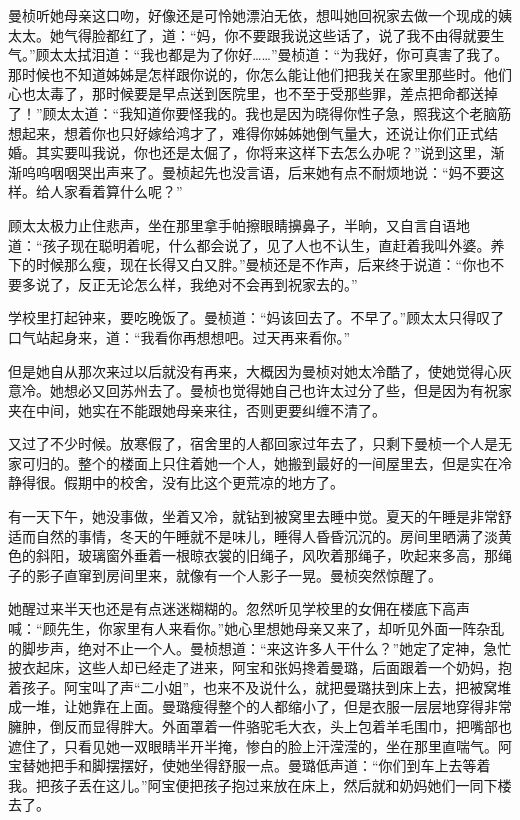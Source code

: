 \par 曼桢听她母亲这口吻，好像还是可怜她漂泊无依，想叫她回祝家去做一个现成的姨太太。她气得脸都红了，道：“妈，你不要跟我说这些话了，说了我不由得就要生气。”顾太太拭泪道：“我也都是为了你好……”曼桢道：“为我好，你可真害了我了。那时候也不知道姊姊是怎样跟你说的，你怎么能让他们把我关在家里那些时。他们心也太毒了，那时候要是早点送到医院里，也不至于受那些罪，差点把命都送掉了！”顾太太道：“我知道你要怪我的。我也是因为晓得你性子急，照我这个老脑筋想起来，想着你也只好嫁给鸿才了，难得你姊姊她倒气量大，还说让你们正式结婚。其实要叫我说，你也还是太倔了，你将来这样下去怎么办呢？”说到这里，渐渐呜呜咽咽哭出声来了。曼桢起先也没言语，后来她有点不耐烦地说：“妈不要这样。给人家看着算什么呢？”
\par 顾太太极力止住悲声，坐在那里拿手帕擦眼睛擤鼻子，半晌，又自言自语地道：“孩子现在聪明着呢，什么都会说了，见了人也不认生，直赶着我叫外婆。养下的时候那么瘦，现在长得又白又胖。”曼桢还是不作声，后来终于说道：“你也不要多说了，反正无论怎么样，我绝对不会再到祝家去的。”
\par 学校里打起钟来，要吃晚饭了。曼桢道：“妈该回去了。不早了。”顾太太只得叹了口气站起身来，道：“我看你再想想吧。过天再来看你。”
\par 但是她自从那次来过以后就没有再来，大概因为曼桢对她太冷酷了，使她觉得心灰意冷。她想必又回苏州去了。曼桢也觉得她自己也许太过分了些，但是因为有祝家夹在中间，她实在不能跟她母亲来往，否则更要纠缠不清了。
\par 又过了不少时候。放寒假了，宿舍里的人都回家过年去了，只剩下曼桢一个人是无家可归的。整个的楼面上只住着她一个人，她搬到最好的一间屋里去，但是实在冷静得很。假期中的校舍，没有比这个更荒凉的地方了。
\par 有一天下午，她没事做，坐着又冷，就钻到被窝里去睡中觉。夏天的午睡是非常舒适而自然的事情，冬天的午睡就不是味儿，睡得人昏昏沉沉的。房间里晒满了淡黄色的斜阳，玻璃窗外垂着一根晾衣裳的旧绳子，风吹着那绳子，吹起来多高，那绳子的影子直窜到房间里来，就像有一个人影子一晃。曼桢突然惊醒了。
\par 她醒过来半天也还是有点迷迷糊糊的。忽然听见学校里的女佣在楼底下高声喊：“顾先生，你家里有人来看你。”她心里想她母亲又来了，却听见外面一阵杂乱的脚步声，绝对不止一个人。曼桢想道：“来这许多人干什么？”她定了定神，急忙披衣起床，这些人却已经走了进来，阿宝和张妈搀着曼璐，后面跟着一个奶妈，抱着孩子。阿宝叫了声“二小姐”，也来不及说什么，就把曼璐扶到床上去，把被窝堆成一堆，让她靠在上面。曼璐瘦得整个的人都缩小了，但是衣服一层层地穿得非常臃肿，倒反而显得胖大。外面罩着一件骆驼毛大衣，头上包着羊毛围巾，把嘴部也遮住了，只看见她一双眼睛半开半掩，惨白的脸上汗滢滢的，坐在那里直喘气。阿宝替她把手和脚摆摆好，使她坐得舒服一点。曼璐低声道：“你们到车上去等着我。把孩子丢在这儿。”阿宝便把孩子抱过来放在床上，然后就和奶妈她们一同下楼去了。

